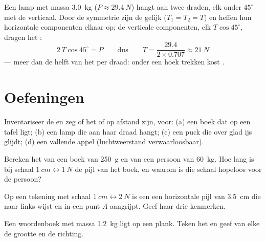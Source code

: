 \begin{example}\label{ex:g10:inertia:lamp}
Een lamp met massa \qty{3.0}{kg} ($P \approx \qty{29.4}{N}$) hangt aan
twee draden, elk onder $45^\circ$ met de verticaal. Door de symmetrie
zijn de  gelijk ($T_1 = T_2 = T$) en heffen hun horizontale
componenten elkaar op; de verticale componenten, elk $T \cos 45^\circ$,
dragen het :
\[
2\,T \cos 45^\circ = P
\qquad\text{dus}\qquad
T = \frac{29.4}{2 \times 0.707} \approx \qty{21}{N}
\]
--- meer dan de helft van het  per draad: onder een hoek trekken
kost .
\end{example}

\section{Oefeningen}

\begin{exercise}[$\star$]\label{exo:g10:inertia:1}
Inventariseer de  en zeg of het  of  op
afstand zijn, voor: (a) een boek dat op een tafel ligt; (b) een lamp die
aan haar draad hangt; (c) een puck die over glad ijs glijdt; (d) een
vallende appel (luchtweerstand verwaarloosbaar).
\end{exercise}

\begin{exercise}[$\star$]\label{exo:g10:inertia:2}
Bereken het  van een boek van \qty{250}{g} en van een persoon van
\qty{60}{kg}. Hoe lang is bij schaal
$\qty{1}{cm} \leftrightarrow \qty{1}{N}$ de pijl van het boek, en waarom
is die schaal hopeloos voor de persoon?
\end{exercise}

\begin{exercise}[$\star$]\label{exo:g10:inertia:3}
Op een tekening met schaal $\qty{1}{cm} \leftrightarrow \qty{2}{N}$ is
een  een horizontale pijl van \qty{3.5}{cm} die naar links wijst en
in een punt $A$ aangrijpt. Geef haar drie kenmerken.
\end{exercise}

\begin{exercise}[$\star$]\label{exo:g10:inertia:4}
Een woordenboek met massa \qty{1.2}{kg} ligt op een plank. Teken het
 en geef van elke  de grootte en de richting.
\end{exercise}

